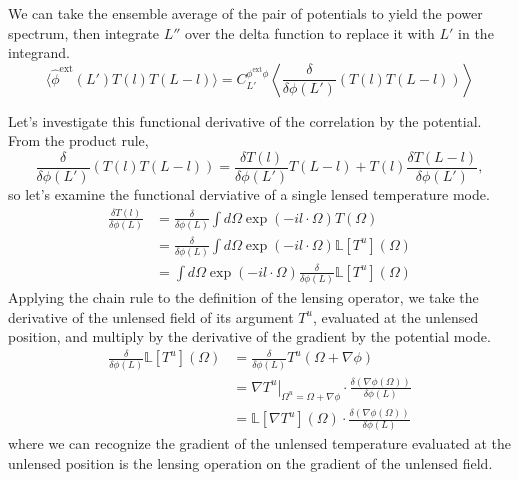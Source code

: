 We can take the ensemble average of the pair of potentials to yield the power spectrum, then integrate $L''$ over the delta function to replace it with $L'$ in the integrand.
\begin{equation}
\langle \hat \phi^\textrm{ext}(L') T(l) T(L-l) \rangle =  C_{L'}^{\phi^\textrm{ext} \phi} \left\langle \frac{\delta}{\delta \phi(L')} \left(  T(l) T(L-l)  \right)  \right\rangle \label{eq:phiextTT}
\end{equation}

Let's investigate this functional derivative of the correlation by the potential.  From the product rule,
\begin{equation}
  \frac{\delta}{\delta \phi(L')} \left(  T(l) T(L-l)  \right) = \frac{\delta T(l)}{\delta \phi(L')} T(L-l) +  T(l) \frac{\delta  T(L-l)}{\delta \phi(L')}, \label{eq:lensingrespose_product_rule}
\end{equation}
so let's examine the functional derviative of a single lensed temperature mode.
\begin{align}
  \frac{\delta T(l)}{\delta \phi(L)}  &=  \frac{\delta}{\delta \phi(L)} \int d\Omega \exp(-il \cdot \Omega) T(\Omega) \label{eq:deltaTdeltaphi} \\ \nonumber
 &= \frac{\delta}{\delta \phi(L)} \int d\Omega \exp(-il \cdot \Omega) \mathbb{L}[T^u](\Omega) \\ \nonumber
  & =  \int d\Omega \exp(-il \cdot \Omega) \frac{\delta}{\delta \phi(L)} \mathbb{L}[T^u](\Omega)
\end{align}
Applying the chain rule to the definition of the lensing operator, we take the derivative of the unlensed field of its argument $T^u$, evaluated at the unlensed position, and multiply by the derivative of the gradient by the potential mode.
\begin{align}
  \frac{\delta}{\delta \phi(L)} \mathbb{L}[T^u](\Omega) &= \frac{\delta}{\delta \phi(L)} T^u(\Omega + \nabla \phi) \\ \nonumber
  &= \left. \nabla T^u \right|_{\Omega^u  = \Omega + \nabla\phi} \cdot \frac{\delta (\nabla \phi(\Omega))}{\delta \phi(L)} \\ \nonumber
  &=  \mathbb{L}[ \nabla T^u](\Omega) \cdot \frac{\delta (\nabla \phi(\Omega))}{\delta \phi(L)}
\end{align}
where we can recognize the gradient of the unlensed temperature evaluated at the unlensed position is the lensing operation on the gradient of the unlensed field.

